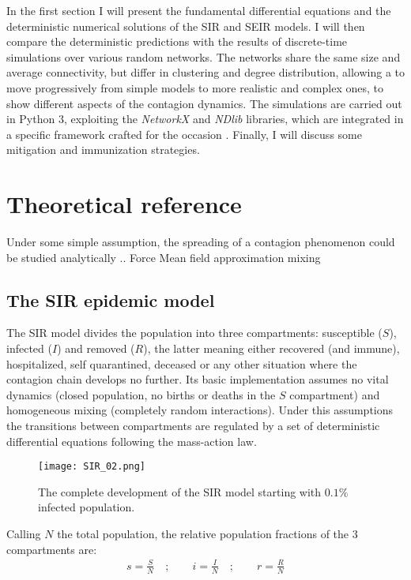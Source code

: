 \documentclass[DIV=12, BCOR=0pt]{scrartcl}  %
\begin{document}
 	In the first section I will present the fundamental differential equations and the deterministic numerical solutions of the SIR and SEIR models. I will then compare the deterministic predictions with the results of discrete-time simulations over various random networks. The networks share the same size and average connectivity, but differ in clustering and degree distribution, allowing a to move progressively from simple models to more realistic and complex ones, to show different aspects of the contagion dynamics. The simulations are carried out in Python 3, exploiting the \textit{NetworkX} and \textit{NDlib} libraries, which are integrated in a specific framework crafted for the occasion \citep{pyndemic}. Finally, I will discuss some mitigation and immunization strategies.
  
  \section{Theoretical reference}
  \label{sec:theory}
  Under some simple assumption, the spreading of a contagion phenomenon could be studied analytically ..
  Force 
  Mean field approximation
  mixing
  
  \subsection{The SIR epidemic model}
  The SIR model divides the population into three compartments: susceptible ($S$), infected ($I$) and removed ($R$), the latter meaning either recovered (and immune), hospitalized, self quarantined, deceased or any other situation where the contagion chain develops no further. Its basic implementation assumes no vital dynamics (closed population, no births or deaths in the $S$ compartment) and homogeneous mixing (completely random interactions). Under this assumptions the transitions between compartments are regulated by a set of deterministic differential equations following the mass-action law. \\
  \begin{figure}[h]
  	\centering
  	\texttt{[image: SIR\_02.png]}
  	\caption{The complete development of the SIR model starting with $0.1\%$ infected population.}
  	\label{fig:SIRtot}
  \end{figure}


  Calling $N$ the total population, the relative population fractions of the 3 compartments are:
  \begin{align}
			s = \frac{S}{N}  \quad;  \qquad 	 i = \frac{I}{N}  \quad;  \qquad 	 r = \frac{R}{N}
  \end{align}
\end{document}
